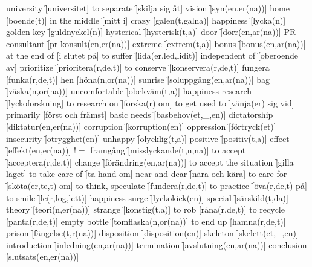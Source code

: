 \begin{questions}
\begin{multicols}{2}
        \question university \f[universitet]
        \question to separate \f[skilja sig åt]
        \question vision \f[syn(en,er(na))]
        \question home \f[boende(t)]
        \question in the middle \f[mitt i]
        \question crazy \f[galen(t,galna)]
        \question happiness \f[lycka(n)]
        \question golden key \f[guldnyckel(n)]
        \question hysterical \f[hysterisk(t,a)]
        \question door \f[dörr(en,ar(na))]
        \question PR consultant \f[pr-konsult(en,er(na))]
        \question extreme \f[extrem(t,a)]
        \question bonus \f[bonus(en,ar(na))]
        \question at the end of \f[i slutet på]
        \question to suffer \f[lida(er,led,lidit)]
        \question independent of \f[oberoende av]
        \question prioritize \f[prioritera(r,de,t)]
        \question to conserve \f[konservera(r,de,t)]
        \question fungera \f[funka(r,de,t)]
        \question hen \f[höna(n,or(na))]
        \question sunrise \f[soluppgång(en,ar(na))]
        \question bag \f[väska(n,or(na))]
        \question uncomfortable \f[obekväm(t,a)]
        \question happiness research \f[lyckoforskning]
        \question to research on \f[forska(r) om]
        \question to get used to \f[vänja(er) sig vid]
        \question primarily \f[först och främst]
        \question basic needs \f[basbehov(et,\_,en)]
        \question dictatorship \f[diktatur(en,er(na))]
        \question corruption \f[korruption(en)]
        \question oppression \f[förtryck(et)]
        \question insecurity \f[otrygghet(en)]
        \question unhappy \f[olycklig(t,a)]
        \question positive \f[positiv(t,a)]
        \question effect \f[effekt(en,er(na))]
        \question $!=$ framgång \f[misslyckande(t,n,na)]
        \question to accept \f[acceptera(r,de,t)]
        \question change \f[förändring(en,ar(na))]
        \question to accept the situation \f[gilla läget]
        \question to take care of \f[ta hand om]
        \question near and dear \f[nära och kära]
        \question to care for \f[sköta(er,te,t) om]
        \question to think, speculate \f[fundera(r,de,t)]
        \question to practice \f[öva(r,de,t) på]
        \question to smile \f[le(r,log,lett)]
        \question happiness surge \f[lyckokick(en)]
        \question special \f[särskild(t,da)]
        \question theory \f[teori(n,er(na))]
        \question strange \f[konstig(t,a)]
        \question to rob \f[råna(r,de,t)]
        \question to recycle \f[panta(r,de,t)]
        \question empty bottle \f[tomflaska(n,or(na))]
        \question to end up \f[hamna(r,de,t)]
        \question prison \f[fängelse(t,r(na))]
        \question disposition \f[disposition(en)]
        \question skeleton \f[skelett(et,\_,en)]
        \question introduction \f[inledning(en,ar(na))]
        \question termination \f[avslutning(en,ar(na))]
        \question conclusion \f[slutsats(en,er(na))]
    \end{multicols}
\end{questions}
